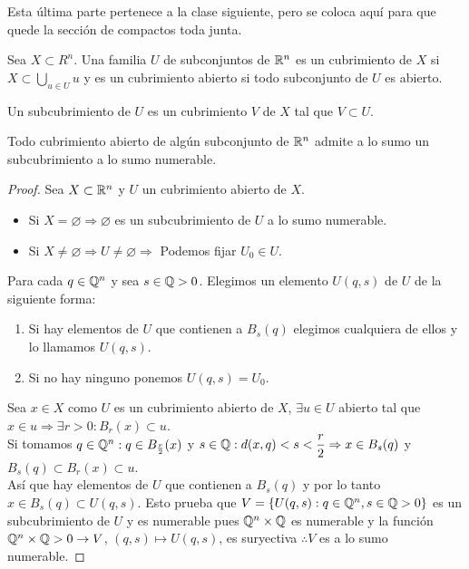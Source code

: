 Esta última parte pertenece a la clase siguiente, pero se coloca aquí para que quede la sección de compactos toda junta.

\begin{definition}[Cubrimiento]
  Sea \(X \subset R^n\). Una familia \(U\) de subconjuntos de \(\mathbb{R}^n\) es un cubrimiento de \(X\) si \(X \subset \bigcup_{u \in U} u\) y es un cubrimiento abierto si todo subconjunto de \(U\) es abierto.
\end{definition}

\begin{definition}[Subcubrimiento]
  Un subcubrimiento de \(U\) es un cubrimiento \(V\) de \(X\) tal que \(V \subset U\).
\end{definition}

\begin{theorem}[Lindelöf]
  Todo cubrimiento abierto de algún subconjunto de \(\mathbb{R}^n\) admite a lo sumo un subcubrimiento a lo sumo numerable.
  \begin{proof}
    Sea \(X \subset \mathbb{R}^n\) y \(U\) un cubrimiento abierto de \(X\).
    \begin{itemize}
      \item Si \(X = \varnothing \Rightarrow \varnothing \) es un subcubrimiento de \(U\) a lo
            sumo numerable.
      \item Si \(X \neq \varnothing \Rightarrow U \neq \varnothing \Rightarrow \) Podemos
            fijar \(U_0 \in U\).
    \end{itemize}
    Para cada \(q \in \mathbb{Q}^n\) y sea \(s \in \mathbb{Q} > 0\). Elegimos un elemento \(U(q, s)\) de \(U\) de la siguiente forma:
    \begin{enumerate}
      \item Si hay elementos de \(U\) que contienen a \(B_s(q)\) elegimos cualquiera de ellos y
            lo llamamos \(U(q, s)\).
      \item Si no hay ninguno ponemos \(U(q, s) = U_0\).
    \end{enumerate}
    Sea \(x \in X\) como \(U\) es un cubrimiento abierto de \(X\), \(\exists u \in U\) abierto tal que \(x \in u \Rightarrow \exists r > 0 : B_r(x) \subset u\). \\
    Si tomamos \(q \in \mathbb{Q}^n : q \in B_{\frac{r}{2}}(x)\) y \(s \in \mathbb{Q} : d(x, q) < s < \dfrac{r}{2} \Rightarrow x \in B_s(q)\) y \(B_s(q) \subset B_r(x) \subset u\). \\
    Así que hay elementos de \(U\) que contienen a \(B_s(q)\) y por lo tanto \(x \in B_s(q) \subset U(q, s)\). Esto prueba que \(V = \{ U(q, s) : q \in \mathbb{Q}^n, s \in \mathbb{Q} > 0 \} \) es un subcubrimiento de \(U\)
    y es numerable pues \(\mathbb{Q}^n \times \mathbb{Q} \) es numerable y la función \( \mathbb{Q}^n \times \mathbb{Q} > 0 \to V\), \((q, s) \mapsto U(q, s)\), es suryectiva \(\therefore V\) es a lo sumo numerable.
  \end{proof}
\end{theorem}

